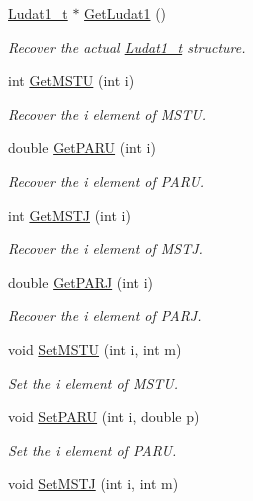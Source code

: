 \begin{DoxyCompactItemize}
\hyperlink{struct_ludat1__t}{Ludat1\+\_\+t} $\ast$ \hyperlink{class_t_djangoh_a41238ae5ec3462ec62afd7e6b1a9c053}{Get\+Ludat1} ()
\begin{DoxyCompactList}\small\item\em Recover the actual \hyperlink{struct_ludat1__t}{Ludat1\+\_\+t} structure. \end{DoxyCompactList}\item 
int \hyperlink{class_t_djangoh_a945d0bc3bb15463dc13e5f317e1acb85}{Get\+M\+S\+T\+U} (int i)
\begin{DoxyCompactList}\small\item\em Recover the i element of M\+S\+T\+U. \end{DoxyCompactList}\item 
double \hyperlink{class_t_djangoh_a2437af1524d88ab2a27ce156e5b59dc3}{Get\+P\+A\+R\+U} (int i)
\begin{DoxyCompactList}\small\item\em Recover the i element of P\+A\+R\+U. \end{DoxyCompactList}\item 
int \hyperlink{class_t_djangoh_a0680c8515e55fe020bb5f6879e03e570}{Get\+M\+S\+T\+J} (int i)
\begin{DoxyCompactList}\small\item\em Recover the i element of M\+S\+T\+J. \end{DoxyCompactList}\item 
double \hyperlink{class_t_djangoh_acca1999c25174c677a7476936deda040}{Get\+P\+A\+R\+J} (int i)
\begin{DoxyCompactList}\small\item\em Recover the i element of P\+A\+R\+J. \end{DoxyCompactList}\item 
void \hyperlink{class_t_djangoh_a384df028825302ce79c109f145e1b02a}{Set\+M\+S\+T\+U} (int i, int m)
\begin{DoxyCompactList}\small\item\em Set the i element of M\+S\+T\+U. \end{DoxyCompactList}\item 
void \hyperlink{class_t_djangoh_ab7568cf96eb1a4ede5cc0d061a129db7}{Set\+P\+A\+R\+U} (int i, double p)
\begin{DoxyCompactList}\small\item\em Set the i element of P\+A\+R\+U. \end{DoxyCompactList}\item 
void \hyperlink{class_t_djangoh_a36615fc810cc9c50701982ed0cd3121b}{Set\+M\+S\+T\+J} (int i, int m)

\end{DoxyCompactItemize}
